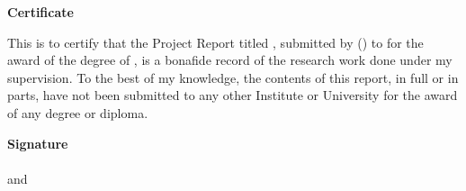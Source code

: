 \begin{flushright}
\huge{\textbf{Certificate}}
\end{flushright}

\vspace{0.5cm}

This is to certify that the Project Report titled \textbf{\ttitle}, submitted by \authorname{} (\rn{}) to \univname{} for the award of the degree of \degree{}, is a bonafide record of the research work done under my supervision. To the best of my knowledge, the contents of this report, in full or in parts, have not been submitted to any other Institute or University for the award of any degree or diploma.

\vspace{3cm}

\begin{flushright}
\large{\textbf{Signature}}\\[0.5cm]
\\
and
\\
\\
\end{flushright}
